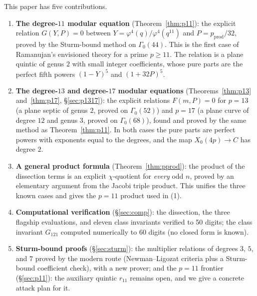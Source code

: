 \documentclass[11pt]{amsart}
\theoremstyle{plain}
\theoremstyle{definition}
\theoremstyle{remark}
\newcommand{\pprod}{p_{\mathrm{prod}}}
\begin{document}
This paper has five contributions.
\begin{enumerate}
\item \textbf{The degree-$11$ modular equation} (Theorem~\ref{thm:p11}): the explicit
relation $G(Y,P) = 0$ between $Y = \varphi^4(q)/\varphi^4(q^{11})$ and
$P = \pprod/32$, proved by the Sturm-bound method on $\Gamma_0(44)$. This is the
first case of Ramanujan's envisioned theory for a prime $p \geq 11$. The relation is
a plane quintic of genus $2$ with small integer coefficients, whose pure parts are
the perfect fifth powers $(1-Y)^5$ and $(1+32P)^5$.
\item \textbf{The degree-$13$ and degree-$17$ modular equations}
(Theorems~\ref{thm:p13} and~\ref{thm:p17}, \S\ref{sec:p1317}): the explicit relations
$F(m,P) = 0$ for $p = 13$ (a plane septic of genus $2$, proved on $\Gamma_0(52)$)
and $p = 17$ (a plane curve of degree $12$ and genus $3$, proved on $\Gamma_0(68)$),
found and proved by the same method as Theorem~\ref{thm:p11}. In both cases the
pure parts are perfect powers with exponents equal to the degrees, and the map
$X_0(4p) \to C$ has degree $2$.
\item \textbf{A general product formula} (Theorem~\ref{thm:pprod}): the product of
the dissection terms is an explicit $\chi$-quotient for \emph{every} odd $n$,
proved by an elementary argument from the Jacobi triple product. This unifies the
three known cases and gives the $p=11$ product used in (1).
\item \textbf{Computational verification} (\S\ref{sec:comp}): the dissection, the
three flagship evaluations, and eleven class invariants verified to 50 digits; the
class invariant $G_{121}$ computed numerically to 60 digits (no closed form is
known).
\item \textbf{Sturm-bound proofs} (\S\ref{sec:sturm}): the multiplier relations of
degrees $3$, $5$, and $7$ proved by the modern route (Newman--Ligozat criteria plus
a Sturm-bound coefficient check), with a new prover; and the $p=11$ frontier
(\S\ref{sec:p11}): the auxiliary quintic $r_{11}$ remains open, and we give a
concrete attack plan for it.
\end{enumerate}
\end{document}
